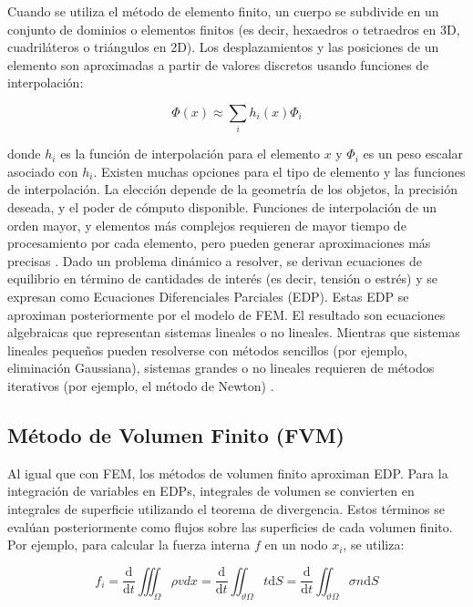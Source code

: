 Cuando se utiliza el método de elemento finito, un cuerpo se subdivide en un conjunto de dominios o elementos finitos (es decir, hexaedros o tetraedros en 3D, cuadriláteros o triángulos en 2D). Los desplazamientos y las posiciones de un elemento son aproximadas a partir de valores discretos usando funciones de interpolación:

\begin{equation}
	\Phi(x) \approx \sum_i{h_i(x)\Phi_i}
\end{equation}

donde $h_i$ es la función de interpolación para el elemento $x$ y $\Phi_i$ es un peso escalar asociado con $h_i$. Existen muchas opciones para el tipo de elemento y las funciones de interpolación. La elección depende de la geometría de los objetos, la precisión deseada, y el poder de cómputo disponible. Funciones de interpolación de un orden mayor, y elementos más complejos requieren de mayor tiempo de procesamiento por cada elemento, pero pueden generar aproximaciones más precisas \citep{fix2008analysis}. Dado un problema dinámico a resolver, se derivan ecuaciones de equilibrio en término de cantidades de interés (es decir, tensión o estrés) y se expresan como Ecuaciones Diferenciales Parciales (EDP). Estas EDP se aproximan posteriormente por el modelo de FEM. El resultado son ecuaciones algebraicas que representan sistemas lineales o no lineales. Mientras que sistemas lineales pequeños pueden resolverse con métodos sencillos (por ejemplo, eliminación Gaussiana), sistemas grandes o no lineales requieren de métodos iterativos (por ejemplo, el método de Newton) \citep{press1992numerical}.

\subsection{Método de Volumen Finito (FVM)}

Al igual que con FEM, los métodos de volumen finito aproximan EDP. Para la integración de variables en EDPs, integrales de volumen se convierten en integrales de superficie utilizando el teorema de divergencia. Estos términos se evalúan posteriormente como flujos sobre las superficies de cada volumen finito. Por ejemplo, para calcular la fuerza interna $f$ en un nodo $x_i$, se utiliza:

\begin{equation}
	f_i = \frac{\mathrm d}{\mathrm dt} \iiint_\Omega \rho v dx = \frac{\mathrm d}{\mathrm dt} \iint_{\vartheta\Omega} t \mathrm{d}S = \frac{\mathrm d}{\mathrm dt} \iint_{\vartheta\Omega} \sigma n \mathrm{d}S
\end{equation}

